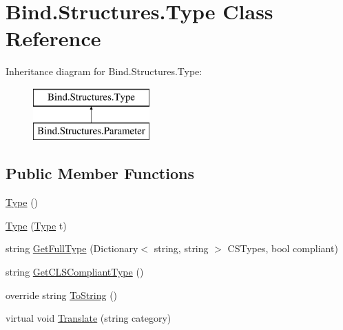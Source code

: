 \hypertarget{class_bind_1_1_structures_1_1_type}{
\section{Bind.Structures.Type Class Reference}
\label{class_bind_1_1_structures_1_1_type}
}
Inheritance diagram for Bind.Structures.Type:\begin{figure}[H]
\begin{center}
\leavevmode
\includegraphics[height=2.000000cm]{class_bind_1_1_structures_1_1_type}
\end{center}
\end{figure}
\subsection*{Public Member Functions}
\begin{DoxyCompactItemize}
\item 
\hyperlink{class_bind_1_1_structures_1_1_type_a6a9e9d06960a94d12721fa3423a7237d}{Type} ()
\item 
\hyperlink{class_bind_1_1_structures_1_1_type_a9971a20df7f4116185c9592eee5db491}{Type} (\hyperlink{class_bind_1_1_structures_1_1_type}{Type} t)
\item 
string \hyperlink{class_bind_1_1_structures_1_1_type_a5f03d1ae1af7d66a79249cdfcb686f52}{GetFullType} (Dictionary$<$ string, string $>$ CSTypes, bool compliant)
\item 
string \hyperlink{class_bind_1_1_structures_1_1_type_ae74f074c5e289452140b021cbf0eb121}{GetCLSCompliantType} ()
\item 
override string \hyperlink{class_bind_1_1_structures_1_1_type_aa94c9ff7ad98975e124ccab583c7c7b7}{ToString} ()
\item 
virtual void \hyperlink{class_bind_1_1_structures_1_1_type_a8f9bc4c091a737a26484b36d6ec8703f}{Translate} (string category)
\end{DoxyCompactItemize}
